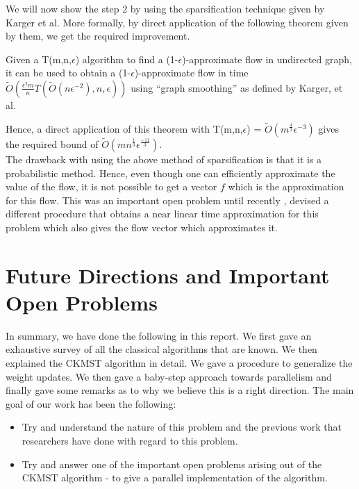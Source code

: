 \documentclass[BTech]{iitmdiss}
\begin{document}
		We will now show the step 2 by using the sparsification technique given by Karger et al. More formally, by direct application of the 
		following theorem given by them, we get the required improvement. 
		
		\begin{thm}
		 Given a T(m,n,$\epsilon$) algorithm to find a (1-$\epsilon$)-approximate flow in undirected graph, it can be used to obtain 
		 a (1-$\epsilon$)-approximate flow in time $\widetilde{O}(\frac{\epsilon^2 m}{n}T(\widetilde{O}(n \epsilon^{-2}),n,\epsilon))$ using 
		 ``graph smoothing'' as defined by Karger, et al.
		\end{thm}

		Hence, a direct application of this theorem with T(m,n,$\epsilon$) = $\widetilde{O}(m^{\frac{4}{3}} \epsilon^{-3})$ gives 
		the required bound of $\widetilde{O}(mn^{\frac{1}{3}} \epsilon^{\frac{-11}{3}})$. \\
		
		The drawback with using the above method of sparsification is that it is a probabilistic method. Hence, even though one can efficiently
		approximate the value of the flow, it is not possible to get a vector $f$ which is the approximation for this flow. This was an important
		open problem until recently \cite{DBLP:journals/corr/abs-1304-2338}, devised a different procedure that obtains a near linear time approximation for this
		problem which also gives the flow vector which approximates it. 
		
		\chapter{Future Directions and Important Open Problems}
		  In summary, we have done the following in this report. We first gave an exhaustive survey of all the classical algorithms that are known.
		  We then explained the CKMST algorithm in detail. We gave a procedure to generalize the weight updates. We then gave a baby-step
		  approach towards parallelism and finally gave some remarks as to why we believe this is a right direction. The main goal of our work
		  has been the following:
		  \begin{itemize}
		   \item 
		    Try and understand the nature of this problem and the previous work that researchers have done with regard to this problem.
		   \item
		    Try and answer one of the important open problems arising out of the CKMST algorithm - to give a parallel implementation of 
		    the algorithm.
		  \end{itemize}
\end{document}
